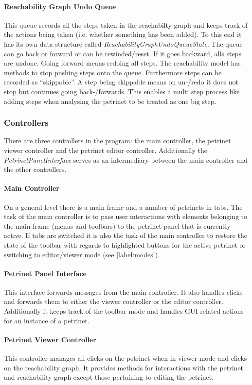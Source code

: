 \documentclass[10pt, a4paper]{article}
\begin{document}
\paragraph{Reachability Graph Undo Queue} This queue records all the steps taken in the reachabilty graph and keeps track of the actions being taken (i.e. whether something has been added). To this end it has its own data structure called \textit{ReachabilityGraphUndoQueueState}. The queue can go back or forward or can be rewinded/reset. If it goes backward, alls steps are undone. Going forward means redoing all steps. The reachability model has methods to stop pushing steps onto the queue. Furthermore steps can be recorded as \enquote{skippable}. A step being skippable means on un-/redo it does not stop but continues going back-/forwards. This enables a multi step process like adding steps when analysing the petrinet to be treated as one big step.  

\subsubsection{Controllers}
There are three controllers in the program: the main controller, the petrinet viewer controller and the petrinet editor controller. Additionally the \textit{PetrinetPanelInterface} serves as an intermediary between the main controller and the other controllers.

\paragraph{Main Controller} On a general level there is a main frame and a number of petrinets in tabs. The task of the main controller is to pass user interactions with elements belonging to the main frame (menus and toolbars) to the petrinet panel that is currently active. If tabs are switched it is also the task of the main controller to restore the state of the toolbar with regards to highlighted buttons for the active petrinet or switching to editor/viewer mode (see \ref{label:modes}). 
\paragraph{Petrinet Panel Interface} This interface forwards messages from the main controller. It also handles clicks and forwards them to either the viewer controller or the editor controller. Additionally it keeps track of the toolbar mode and handles GUI related actions for an instance of a petrinet. 
\paragraph{Petrinet Viewer Controller} This controller manages all clicks on the petrinet when in viewer mode and clicks on the reachability graph. It provides methods for interactions with the petrinet and reachability graph except those pertaining to editing the petrinet.  
\end{document}

